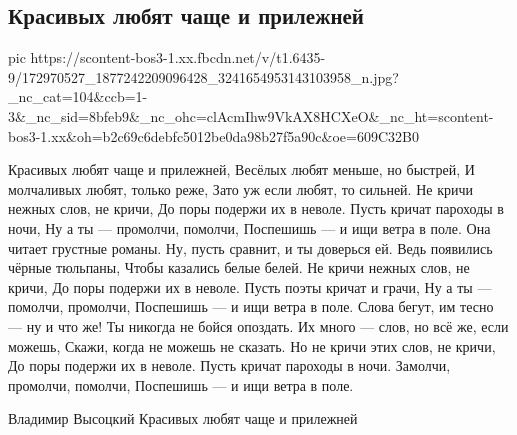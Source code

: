  
 
 
 
 

\subsection{Красивых любят чаще и прилежней}
\label{sec:13_04_2021.fb.poem_averinaclub.1.slova_vysockij}


\ifcmt
  pic https://scontent-bos3-1.xx.fbcdn.net/v/t1.6435-9/172970527_1877242209096428_3241654953143103958_n.jpg?_nc_cat=104&ccb=1-3&_nc_sid=8bfeb9&_nc_ohc=clAcmIhw9VkAX8HCXeO&_nc_ht=scontent-bos3-1.xx&oh=b2c69c6debfc5012be0da98b27f5a90c&oe=609C32B0
\fi

Красивых любят чаще и прилежней, 
Весёлых любят меньше, но быстрей, 
И молчаливых любят, только реже, 
Зато уж если любят, то сильней. 
Не кричи нежных слов, не кричи, 
До поры подержи их в неволе. 
Пусть кричат пароходы в ночи, 
Ну а ты — промолчи, помолчи, 
Поспешишь — и ищи ветра в поле. 
Она читает грустные романы. 
Ну, пусть сравнит, и ты доверься ей. 
Ведь появились чёрные тюльпаны, 
Чтобы казались белые белей. 
Не кричи нежных слов, не кричи, 
До поры подержи их в неволе. 
Пусть поэты кричат и грачи, 
Ну а ты — помолчи, промолчи, 
Поспешишь — и ищи ветра в поле. 
Слова бегут, им тесно — ну и что же! 
Ты никогда не бойся опоздать. 
Их много — слов, но всё же, если можешь, 
Скажи, когда не можешь не сказать. 
Но не кричи этих слов, не кричи, 
До поры подержи их в неволе. 
Пусть кричат пароходы в ночи. 
Замолчи, промолчи, помолчи, 
Поспешишь — и ищи ветра в поле.

Владимир Высоцкий 
Красивых любят чаще и прилежней
